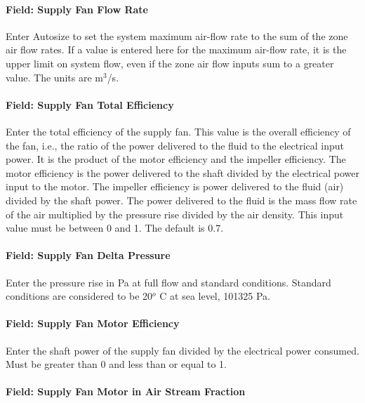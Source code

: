 \paragraph{Field: Supply Fan Flow Rate}\label{field-supply-fan-flow-rate}

Enter Autosize to set the system maximum air-flow rate to the sum of the zone air flow rates. If a value is entered here for the maximum air-flow rate, it is the upper limit on system flow, even if the zone air flow inputs sum to a greater value. The units are m\(^{3}\)/s.

\paragraph{Field: Supply Fan Total Efficiency}\label{field-supply-fan-total-efficiency-11}

Enter the total efficiency of the supply fan. This value is the overall efficiency of the fan, i.e., the ratio of the power delivered to the fluid to the electrical input power. It is the product of the motor efficiency and the impeller efficiency. The motor efficiency is the power delivered to the shaft divided by the electrical power input to the motor. The impeller efficiency is power delivered to the fluid (air) divided by the shaft power. The power delivered to the fluid is the mass flow rate of the air multiplied by the pressure rise divided by the air density. This input value must be between 0 and 1. The default is 0.7.

\paragraph{Field: Supply Fan Delta Pressure}\label{field-supply-fan-delta-pressure-10}

Enter the pressure rise in Pa at full flow and standard conditions. Standard conditions are considered to be 20\(^{o}\) C at sea level, 101325 Pa.

\paragraph{Field: Supply Fan Motor Efficiency}\label{field-supply-fan-motor-efficiency-11}

Enter the shaft power of the supply fan divided by the electrical power consumed. Must be greater than 0 and less than or equal to 1.

\paragraph{Field: Supply Fan Motor in Air Stream Fraction}\label{field-supply-fan-motor-in-air-stream-fraction-7}

